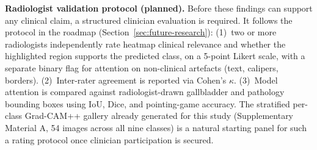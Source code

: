 \textbf{Radiologist validation protocol (planned).} Before these findings can support any clinical claim, a structured clinician evaluation is required. It follows the protocol in the roadmap (Section~\ref{sec:future-research}): (1)~two or more radiologists independently rate heatmap clinical relevance and whether the highlighted region supports the predicted class, on a 5-point Likert scale, with a separate binary flag for attention on non-clinical artefacts (text, calipers, borders). (2)~Inter-rater agreement is reported via Cohen's $\kappa$. (3)~Model attention is compared against radiologist-drawn gallbladder and pathology bounding boxes using IoU, Dice, and pointing-game accuracy. The stratified per-class Grad-CAM++ gallery already generated for this study (Supplementary Material A, 54 images across all nine classes) is a natural starting panel for such a rating protocol once clinician participation is secured.
